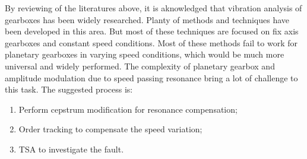 By reviewing of the literatures above, it is aknowledged that vibration analysis of gearboxes has been widely researched. Planty of methods and techniques have been developed in this area. But most of these techniques are focused on fix axis gearboxes and constant speed conditions. Most of these methods fail to work for planetary gearboxes in varying speed conditions, which would be much more universal and widely performed. The complexity of planetary gearbox and amplitude modulation due to speed passing resonance bring a lot of challenge to this task. The suggested process is:

\begin{enumerate}
	\item Perform cepstrum modification for resonance compensation;
	
	\item Order tracking to compensate the speed variation;
	
	\item TSA to investigate the fault.
	
\end{enumerate}















